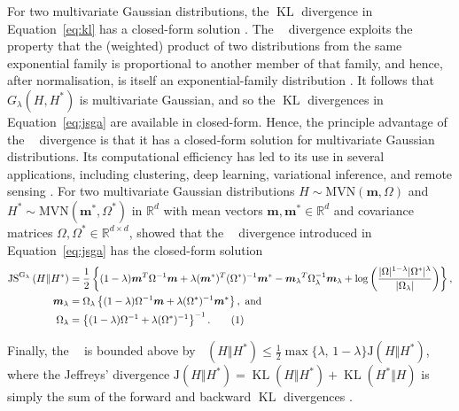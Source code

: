 \documentclass[preprint,12pt,authoryear]{elsarticle}
\DeclareMathOperator{\KL}{KL}
\DeclarePairedDelimiter\abs{\lvert}{\rvert}%
\newcommand{\JSGa}{\mathop{\mathrm{JS}^{\mathrm{G}_{\lambda}}}\nolimits}
\newcommand\numberthis{\addtocounter{equation}{1}\tag{\theequation}}
\begin{document}
For two multivariate Gaussian distributions, the $\KL{}$ divergence in Equation~\eqref{eq:kl} has a closed-form solution \citep{Duchi2007}.
The $\JSGa{}$ divergence exploits the property that the (weighted) product of two distributions from the same exponential family is proportional to another member of that family, and hence, after normalisation, is itself an exponential-family distribution \citep{Nielsen2019}.
It follows that $G_{\lambda}(H, H^*)$ is multivariate Gaussian, and so the $\KL{}$ divergences in Equation~\eqref{eq:jsga} are available in closed-form.
Hence, the principle advantage of the $\JSGa{}$ divergence is that it has a closed-form solution for multivariate Gaussian distributions.
Its computational efficiency \citep{Nielsen2019} has led to its use in several applications, including clustering, deep learning, variational inference, and remote sensing \citep{Nielsen2019, Deasy2020, Ni2023-cd, Thiagarajan2025}.
For two multivariate Gaussian distributions $H \sim \mbox{MVN}(\boldsymbol{m}, \Omega)$ and $H^* \sim \mbox{MVN}(\boldsymbol{m}^*, \Omega^*)$ in $\mathbb{R}^d$ with mean vectors $\boldsymbol{m}, \boldsymbol{m}^* \in \mathbb{R}^d$ and covariance matrices $\Omega, \Omega^* \in \mathbb{R}^{d \times d}$, \citet{Nielsen2019} showed that the $\JSGa{}$ divergence introduced in Equation~\eqref{eq:jsga} has the closed-form solution 
\begin{align*}
  \JSGa{}(H \Vert H^*) &= \frac{1}{2} \left\{ (1-\lambda) \boldsymbol{m}^T \Omega^{-1} \boldsymbol{m} + \lambda (\boldsymbol{m}^*)^T (\Omega^*)^{-1} \boldsymbol{m}^* - {\boldsymbol{m}_{\lambda}}^T \Omega_{\lambda}^{-1} \boldsymbol{m}_{\lambda} + \log{\left( \frac{\abs{\Omega}^{1-\lambda} \abs{\Omega^*}^{\lambda}}{\abs{\Omega_{\lambda}}} \right)} \right\}, \\
  \boldsymbol{m}_{\lambda} &= \Omega_{\lambda} \left\{(1-\lambda) \Omega^{-1} \boldsymbol{m} + \lambda (\Omega^*)^{-1} \boldsymbol{m}^* \right\}, \text{ and} \\
  \Omega_{\lambda} &= \left\{ (1-\lambda) \Omega^{-1} + \lambda (\Omega^*)^{-1} \right\}^{-1}. \numberthis \label{eq:js_norm_mvn1}
\end{align*} 

Finally, the $\JSGa{}$ is bounded above by $\JSGa{(H \Vert H^*)} \leq \frac{1}{2}\max\{\lambda,\,1-\lambda\}\mathrm{J}(H \Vert H^*)$, 
where the Jeffreys' divergence $\mathrm{J}(H \Vert H^*) = \KL{(H \Vert H^*)} + \KL{(H^* \Vert H)}$ is simply the sum of the forward and backward $\KL{}$ divergences \citep{Nielsen2025}.
\end{document}
